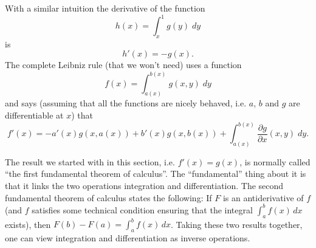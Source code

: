 \documentclass[a4paper,12pt]{article}
\theoremstyle{plain}
\begin{document}
With a similar intuition the derivative of the function 
\begin{equation*}
  h(x)=\int_x^1g(y)\; dy
\end{equation*}
is 
\begin{equation*}
  h'(x)=-g(x).
\end{equation*}
The complete Leibniz rule (that we won't need) uses a function
\begin{equation*}
  f(x)=\int_{a(x)}^{b(x)}g(x,y)\;dy
\end{equation*}
and says (assuming that all the functions are nicely behaved, i.e. $a$, $b$ and $g$ are differentiable at $x$) that 
\begin{equation*}
  f'(x)=-a'(x) g(x,a(x))+b'(x)g(x,b(x))+\int_{a(x)}^{b(x)}\frac{\partial g}{\partial x}(x,y)\;dy.
\end{equation*}

The result we started with in this section, i.e. $f'(x)=g(x)$, is normally called ``the first fundamental theorem of calculus''. The ``fundamental'' thing about it is that it links the two operations integration and differentiation. The second fundamental theorem of calculus states the following: If $F$ is an antiderivative of $f$ (and $f$ satisfies some technical condition ensuring that the integral $\int_a^b f(x)\,dx$ exists), then $F(b)-F(a)=\int_a^b f(x)\,dx$. Taking these two results together, one can view integration and differentiation as inverse operations. 
\end{document}
